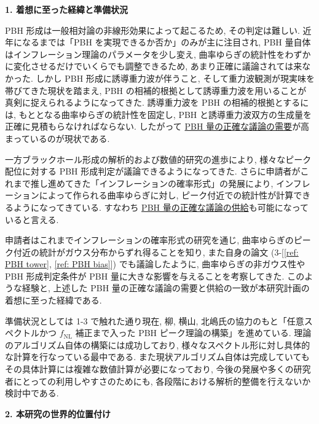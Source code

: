 \documentclass[11pt,a4paper,uplatex,dvipdfmx]{ujarticle} 		%
\newcommand{\研究課題名}{曲率ゆらぎの統計と原始ブラックホール量の精密対応}
\newcommand{\研究機関名}{名古屋大学}
\newcommand{\研究代表者氏名}{多田祐一郎}
\newcommand{\研究期間の最終元号年度}{4}  %
\newcommand{\fNL}{f_\mathrm{NL}}
\begin{document}
\begin{mdframed}[roundcorner=0.5zw,
	innertopmargin=0.8zw,innerbottommargin=0.8zw,
	linecolor=black!50,linewidth=0.2zw,
	backgroundcolor=black!10]
	{\bfseries\gtfamily\sffamily\large 1. 着想に至った経緯と準備状況}
\end{mdframed}

\noindent
PBH 形成は一般相対論の非線形効果によって起こるため, その判定は難しい.
近年になるまでは「PBH を実現できるか否か」のみが主に注目され, PBH 量自体はインフレーション理論のパラメータを少し変え, 曲率ゆらぎの統計性をわずかに変化させるだけでいくらでも調整できるため,
あまり正確に議論されては来なかった.
しかし PBH 形成に誘導重力波が伴うこと, そして重力波観測が現実味を帯びてきた現状を踏まえ, PBH の相補的根拠として誘導重力波を用いることが真剣に捉えられるようになってきた.
誘導重力波を PBH の相補的根拠とするには, もととなる曲率ゆらぎの統計性を固定し, PBH と誘導重力波双方の生成量を正確に見積もらなければならない.
したがって \ul{PBH 量の正確な議論の需要}が高まっているのが現状である.

一方ブラックホール形成の解析的および数値的研究の進歩により, 様々なピーク配位に対する PBH 形成判定が議論できるようになってきた.
さらに申請者がこれまで推し進めてきた「インフレーションの確率形式」の発展により, インフレーションによって作られる曲率ゆらぎに対し, ピーク付近での統計性が計算できるようになってきている.
すなわち \ul{PBH 量の正確な議論の供給}も可能になっていると言える.

申請者はこれまでインフレーションの確率形式の研究を通じ, 曲率ゆらぎのピーク付近の統計がガウス分布からずれ得ることを知り,
また自身の論文 (3-[\ref{ref: PBH tower}, \ref{ref: PBH bias}]) でも議論したように, 曲率ゆらぎの非ガウス性や PBH 形成判定条件が PBH 量に大きな影響を与えることを考察してきた.
このような経験と, 上述した PBH 量の正確な議論の需要と供給の一致が本研究計画の着想に至った経緯である.

準備状況としては 1-3 で触れた通り現在, 柳, 横山, 北嶋氏の協力のもと「任意スペクトルかつ $\fNL$ 補正まで入った PBH ピーク理論の構築」を進めている.
理論のアルゴリズム自体の構築には成功しており, 様々なスペクトル形に対し具体的な計算を行なっている最中である.
また現状アルゴリズム自体は完成していてもその具体計算には複雑な数値計算が必要になっており, 今後の発展や多くの研究者にとっての利用しやすさのためにも,
各段階における解析的整備を行えないか検討中である.


\begin{mdframed}[roundcorner=0.5zw,
	innertopmargin=0.8zw,innerbottommargin=0.8zw,
	linecolor=black!50,linewidth=0.2zw,
	backgroundcolor=black!10]
	{\bfseries\gtfamily\sffamily\large 2. 本研究の世界的位置付け}
\end{mdframed}
\end{document}
